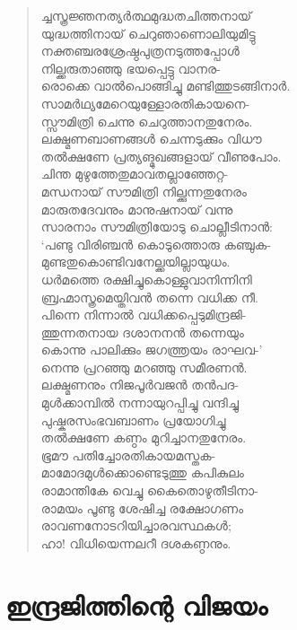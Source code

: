 \begin{verse}
ച്ചസ്ത്രജ്ഞനത്യര്‍ത്ഥമുദ്ധതചിത്തനായ്\\
യുദ്ധത്തിനായ് ചെറുഞാണൊലിയുമിട്ടു\\
നക്തഞ്ചരശ്രേഷ്ഠപുത്രനടുത്തപ്പോള്‍\\
നില്ക്കരുതാഞ്ഞു ഭയപ്പെട്ടു വാനര-\\
രൊക്കെ വാല്‍പൊങ്ങിച്ചു മണ്ടിത്തുടങ്ങിനാര്‍.\\
സാമര്‍ഥ്യമേറെയുള്ളോരതികായനെ-\\
സ്സൗമിത്രി ചെന്നു ചെറുത്താനതുനേരം.\\
ലക്ഷ്മണബാണങ്ങള്‍ ചെന്നടുക്കും വിധൗ\\
തല്‍ക്ഷണേ പ്രത്യങ്മുഖങ്ങളായ് വീണുപോം.\\
ചിന്ത മുഴുത്തേതുമാവതല്ലാഞ്ഞേറ്റ-\\
മന്ധനായ് സൗമിത്രി നില്ക്കുന്നതുനേരം\\
മാരുതദേവനും മാനുഷനായ് വന്നു\\
സാരനാം സൗമിത്രിയോടു ചൊല്ലീടിനാന്‍:\\
‘പണ്ടു വിരിഞ്ചന്‍ കൊടുത്തൊരു കഞ്ചുക-\\
മുണ്ടതുകൊണ്ടിവനേല്ക്കയില്ലായുധം.\\
ധര്‍മത്തെ രക്ഷിച്ചുകൊള്ളുവാനിന്നിനി\\
ബ്രഹ്മാസ്ത്രമെയ്തിവന്‍ തന്നെ വധിക്ക നീ.\\
പിന്നെ നിന്നാല്‍ വധിക്കപ്പെടുമിന്ദ്രജി-\\
ത്തുന്നതനായ ദശാനനന്‍ തന്നെയും\\
കൊന്നു പാലിക്കും ജഗത്ത്രയം രാഘവ-’\\
നെന്നു പ്രറഞ്ഞു മറഞ്ഞു സമീരണന്‍.\\
ലക്ഷ്മണനും നിജപൂര്‍വജന്‍ തന്‍പദ-\\
മുള്‍ക്കാമ്പില്‍ നന്നായുറപ്പിച്ചു വന്ദിച്ചു\\
പുഷ്കരസംഭവബാണം പ്രയോഗിച്ചു\\
തല്‍ക്ഷണേ കണ്ഠം മുറിച്ചാനതുനേരം.\\
ഭൂമൗ പതിച്ചോരതികായമസ്തക-\\
മാമോദമുള്‍ക്കൊണ്ടെടുത്തു കപികുലം\\
രാമാന്തികേ വെച്ചു കൈതൊഴുതീടിനാ-\\
രാമയം പൂണ്ടു ശേഷിച്ച രക്ഷോഗണം\\
രാവണനോടറിയിച്ചാരവസ്ഥകള്‍;\\
ഹാ! വിധിയെന്നലറീ ദശകണ്ഠനും.
\end{verse}


\section{ഇന്ദ്രജിത്തിന്റെ വിജയം}

